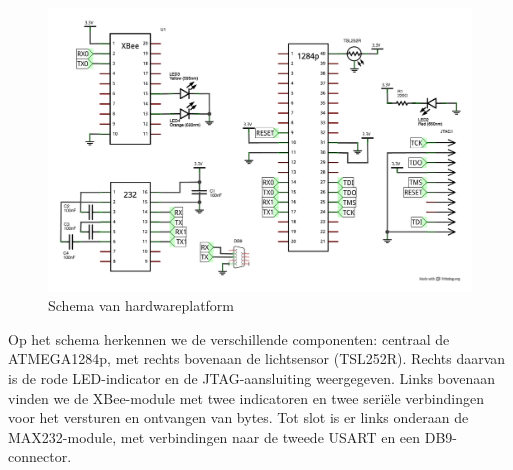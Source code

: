 \begin{figure}[ht]
  \centering
  \includegraphics[width=\linewidth]{resources/hardware-platform-schematic.pdf}
  \caption{Schema van hardwareplatform}
  \label{fig:hardware-platform-schematic}
\end{figure}

Op het schema herkennen we de verschillende componenten: centraal de
ATMEGA1284p, met rechts bovenaan de lichtsensor (TSL252R). Rechts daarvan is de
rode LED-indicator en de JTAG-aansluiting weergegeven. Links bovenaan vinden we
de XBee-module met twee indicatoren en twee seri\"ele verbindingen voor het
versturen en ontvangen van bytes. Tot slot is er links onderaan de
MAX232-module, met verbindingen naar de tweede USART en een DB9-connector.
